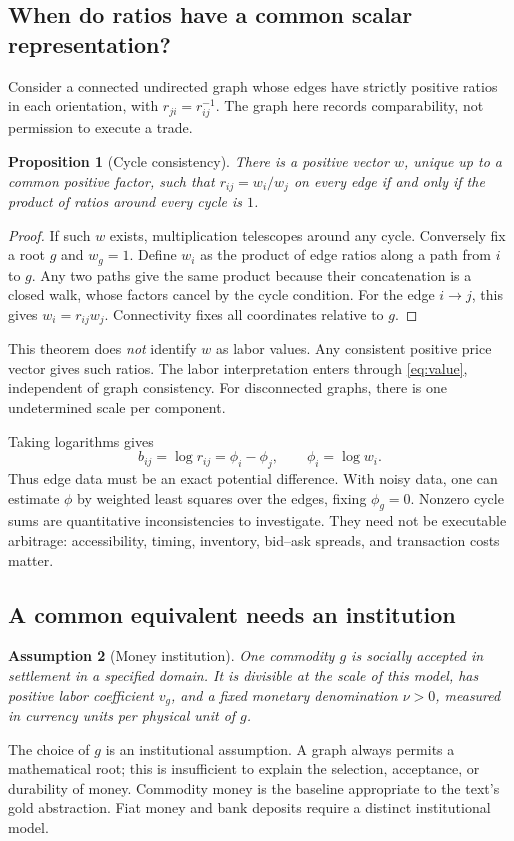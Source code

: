 \documentclass[11pt,letterpaper]{article}
\newtheorem{proposition}{Proposition}[section]
\newtheorem{assumption}[proposition]{Assumption}
\begin{document}
\subsection{When do ratios have a common scalar representation?}
Consider a connected undirected graph whose edges have strictly positive
ratios in each orientation, with $r_{ji}=r_{ij}^{-1}$. The graph here
records comparability, not permission to execute a trade.
\begin{proposition}[Cycle consistency]\label{prop:cycles}
There is a positive vector $w$, unique up to a common positive factor,
such that $r_{ij}=w_i/w_j$ on every edge if and only if the product of
ratios around every cycle is $1$.
\end{proposition}
\begin{proof}
If such $w$ exists, multiplication telescopes around any cycle.
Conversely fix a root $g$ and $w_g=1$. Define $w_i$ as the product of
edge ratios along a path from $i$ to $g$. Any two paths give the same
product because their concatenation is a closed walk, whose factors
cancel by the cycle condition. For the edge $i\to j$, this gives
$w_i=r_{ij}w_j$. Connectivity fixes all coordinates relative to $g$.
\end{proof}

This theorem does \emph{not} identify $w$ as labor values. Any consistent
positive price vector gives such ratios. The labor interpretation enters
through \eqref{eq:value}, independent of graph consistency.
For disconnected graphs, there is one undetermined scale per component.

Taking logarithms gives
\[
 b_{ij}=\log r_{ij}=\phi_i-\phi_j,\qquad \phi_i=\log w_i.
\]
Thus edge data must be an exact potential difference. With noisy data,
one can estimate $\phi$ by weighted least squares over the edges,
fixing $\phi_g=0$. Nonzero cycle sums are quantitative inconsistencies
to investigate. They need not be executable arbitrage: accessibility,
timing, inventory, bid--ask spreads, and transaction costs matter.

\subsection{A common equivalent needs an institution}
\begin{assumption}[Money institution]\label{ass:money}
One commodity $g$ is socially accepted in settlement in a specified
domain. It is divisible at the scale of this model, has positive labor
coefficient $v_g$, and a fixed monetary denomination $\nu>0$, measured
in currency units per physical unit of $g$.
\end{assumption}
The choice of $g$ is an institutional assumption. A graph always permits
a mathematical root; this is insufficient to explain the selection,
acceptance, or durability of money. Commodity money is the baseline
appropriate to the text's gold abstraction. Fiat money and bank deposits
require a distinct institutional model.
\end{document}
